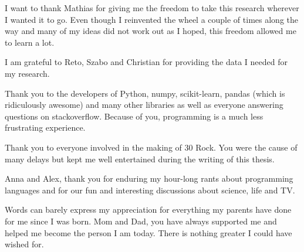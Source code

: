 I want to thank Mathias for giving me the freedom to take this research
wherever I wanted it to go. Even though I reinvented the wheel a couple of
times along the way and many of my ideas did not work out as I hoped, this
freedom allowed me to learn a lot.

I am grateful to Reto, Szabo and Christian for providing the data I needed for
my research.

Thank you to the developers of Python, numpy, scikit-learn, pandas (which is
ridiculously awesome) and many other libraries as well as everyone answering
questions on stackoverflow. Because of you, programming is a much less
frustrating experience.

Thank you to everyone involved in the making of 30 Rock. You were the cause of
many delays but kept me well entertained during the writing of this thesis.

Anna and Alex, thank you for enduring my hour-long rants about programming
languages and for our fun and interesting discussions about science, life and
TV.

Words can barely express my appreciation for everything my parents have done
for me since I was born. Mom and Dad, you have always supported me and helped
me become the person I am today. There is nothing greater I could have wished
for.

